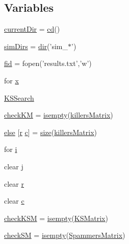 \subsection*{Variables}
\begin{DoxyCompactItemize}
\item 
\hyperlink{a00025_af32eb97339f1e9d37b5540de2cbc79c9}{current\-Dir} = \hyperlink{a00065_abe327856a9ee2f30f3ccafe4dc9edf5e}{cd}()
\item 
\hyperlink{a00025_aae5035eb84b89176ed5b06e136325eff}{sim\-Dirs} = \hyperlink{a00065_a4ca269cf93df1b512b52174c1a256fe5}{dir}('sim\-\_\-$\ast$')
\item 
\hyperlink{a00025_ae9011d40c6f13e68e6f07156e0da7c5d}{fid} = fopen('results.\-txt','w')
\item 
for \hyperlink{a00025_a7265972fe485274cfff77a9bb07b8fce}{x}
\item 
\hyperlink{a00025_af04f94b875b4f18fd2d6bd47d989f2b8}{K\-S\-Search}
\item 
\hyperlink{a00025_ac9c871eaf7455dc0d274ec20c5c69ac2}{check\-K\-M} = \hyperlink{a00019_ac10445404f4b83302522defb59e25ef7}{isempty}(\hyperlink{a00024_ab372fd9c8bb38cf3c78e995c0698b0ca}{killers\-Matrix})
\item 
\hyperlink{a00025_af5946383720aa572eb93e1e63afc23c2}{else} \mbox{[}\hyperlink{a00025_ac862e7284527eb913b1351c8bfb8e079}{r} \hyperlink{a00029_a6be92348ba85ef257b11d06209e1d7b6}{c}\mbox{]} = \hyperlink{a00056_ae113ea7f9e515a12ac4b5595c6faf61e}{size}(\hyperlink{a00024_ab372fd9c8bb38cf3c78e995c0698b0ca}{killers\-Matrix})
\item 
for \hyperlink{a00025_a66a219c6834c25b0073a6bb84e1e0117}{i}
\item 
clear \hyperlink{a00025_ad34e9c7e9ae69ae0b9f1866faed5e4ad}{j}
\item 
clear \hyperlink{a00025_ac862e7284527eb913b1351c8bfb8e079}{r}
\item 
clear \hyperlink{a00025_a8e54ca14679a1ce9245a3b7d55d95570}{c}
\item 
\hyperlink{a00025_a67eb148eecfd241148ce3711f058ac2b}{check\-K\-S\-M} = \hyperlink{a00019_ac10445404f4b83302522defb59e25ef7}{isempty}(\hyperlink{a00024_ab18f9eabd5f873bd17d226d786bc22df}{K\-S\-Matrix})
\item 
\hyperlink{a00025_ae80cf4c5bf659247b45bbad5d22dec52}{check\-S\-M} = \hyperlink{a00019_ac10445404f4b83302522defb59e25ef7}{isempty}(\hyperlink{a00024_a5bca8ffaecd726e70d088f2e00c9b4e0}{Spammers\-Matrix})
\end{DoxyCompactItemize}


